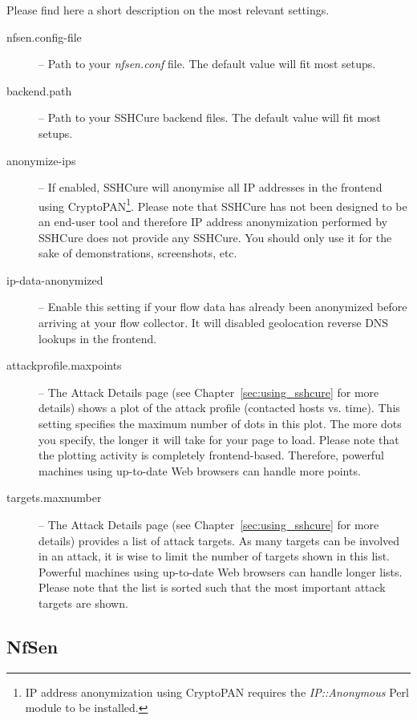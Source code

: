 \noindent
Please find here a short description on the most relevant settings.

\begin{description}
	\item [nfsen.config-file] -- Path to your \textit{nfsen.conf} file. The default value will fit most setups.
	
	\item [backend.path] -- Path to your SSHCure backend files. The default value will fit most setups.
	
	\item [anonymize-ips] -- If enabled, SSHCure will anonymise all IP addresses in the frontend using CryptoPAN\footnote{IP address anonymization using CryptoPAN requires the \textit{IP::Anonymous} Perl module to be installed.}. Please note that SSHCure has not been designed to be an end-user tool and therefore IP address anonymization performed by SSHCure does not provide any SSHCure. You should only use it for the sake of demonstrations, screenshots, etc.
	
	\item [ip-data-anonymized] -- Enable this setting if your flow data has already been anonymized before arriving at your flow collector. It will disabled geolocation reverse DNS lookups in the frontend.
	
	\item [attackprofile.maxpoints] -- The Attack Details page (see Chapter~\ref{sec:using_sshcure} for more details) shows a plot of the attack profile (contacted hosts vs. time). This setting specifies the maximum number of dots in this plot. The more dots you specify, the longer it will take for your page to load. Please note that the plotting activity is completely frontend-based. Therefore, powerful machines using up-to-date Web browsers can handle more points.
	
	\item [targets.maxnumber] -- The Attack Details page (see Chapter~\ref{sec:using_sshcure} for more details) provides a list of attack targets. As many targets can be involved in an attack, it is wise to limit the number of targets shown in this list. Powerful machines using up-to-date Web browsers can handle longer lists. Please note that the list is sorted such that the most important attack targets are shown.
\end{description}

\subsection{NfSen} \label{subsec:nfsen_configuration}

